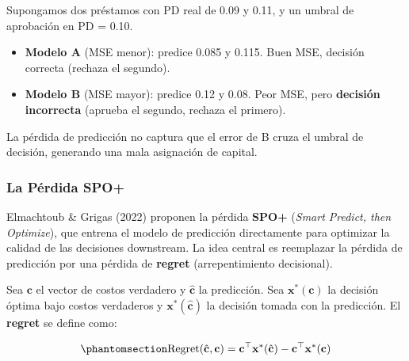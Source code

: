 \documentclass[
  spanish,
  11pt,
  letterpaper,
]{scrbook}
\providecommand{\tightlist}{%
  \setlength{\itemsep}{0pt}\setlength{\parskip}{0pt}}
\theoremstyle{plain}
\theoremstyle{remark}
\begin{document}
\begin{tcolorbox}[enhanced jigsaw, arc=.35mm, bottomrule=.15mm, bottomtitle=1mm, breakable, colback=white, colbacktitle=quarto-callout-tip-color!10!white, colframe=quarto-callout-tip-color-frame, coltitle=black, left=2mm, leftrule=.75mm, opacityback=0, opacitybacktitle=0.6, rightrule=.15mm, title=\textcolor{quarto-callout-tip-color}{\faLightbulb}\hspace{0.5em}{Ejemplo intuitivo}, titlerule=0mm, toprule=.15mm, toptitle=1mm]

Supongamos dos préstamos con PD real de 0.09 y 0.11, y un umbral de
aprobación en PD = 0.10.

\begin{itemize}
\tightlist
\item
  \textbf{Modelo A} (MSE menor): predice 0.085 y 0.115. Buen MSE,
  decisión correcta (rechaza el segundo).
\item
  \textbf{Modelo B} (MSE mayor): predice 0.12 y 0.08. Peor MSE, pero
  \textbf{decisión incorrecta} (aprueba el segundo, rechaza el primero).
\end{itemize}

La pérdida de predicción no captura que el error de B cruza el umbral de
decisión, generando una mala asignación de capital.

\end{tcolorbox}

\subsubsection{La Pérdida SPO+}\label{la-puxe9rdida-spo}

Elmachtoub \& Grigas (2022) proponen la pérdida \textbf{SPO+}
(\emph{Smart Predict, then Optimize}), que entrena el modelo de
predicción directamente para optimizar la calidad de las decisiones
downstream. La idea central es reemplazar la pérdida de predicción por
una pérdida de \textbf{regret} (arrepentimiento decisional).

Sea \(\mathbf{c}\) el vector de costos verdadero y \(\hat{\mathbf{c}}\)
la predicción. Sea \(\mathbf{x}^*(\mathbf{c})\) la decisión óptima bajo
costos verdaderos y \(\mathbf{x}^*(\hat{\mathbf{c}})\) la decisión
tomada con la predicción. El \textbf{regret} se define como:

\begin{equation}\protect\phantomsection\label{eq-regret}{
\text{Regret}(\hat{\mathbf{c}}, \mathbf{c}) = \mathbf{c}^\top \mathbf{x}^*(\hat{\mathbf{c}}) - \mathbf{c}^\top \mathbf{x}^*(\mathbf{c})
}\end{equation}
\end{document}
